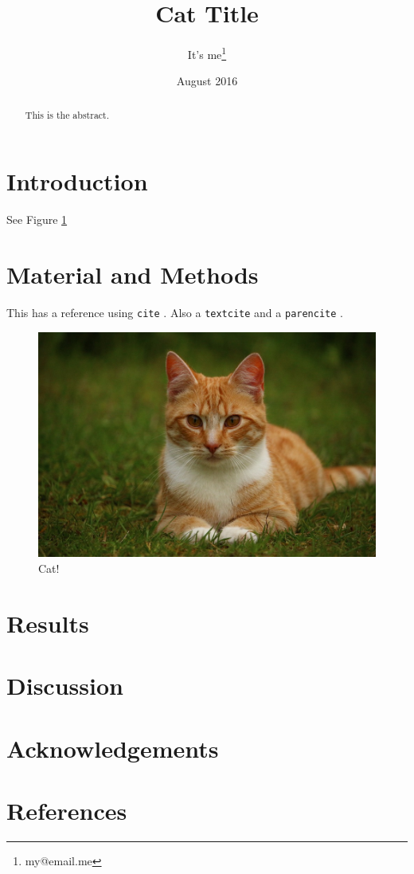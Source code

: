 \documentclass[twoside]{article}
\author{It's me\thanks{my@email.me}}
\date{August 2016}
\title{Cat Title}
\begin{document}
\maketitle
\begin{abstract}
This is the abstract.
\end{abstract}

\setcounter{tocdepth}{2}
\tableofcontents

\section{Introduction}
\label{sec:orgheadline1}

See Figure \ref{fig:orgparagraph1}
\section{Material and Methods}
\label{sec:orgheadline2}

This has a reference using \texttt{cite} \cite{Cats2016}. Also a \texttt{textcite} \textcite{Cats2016} and a \texttt{parencite} \parencite{Cats2016}.
\begin{figure}[htbp]
\centering
\includegraphics[width=\textwidth]{cats.jpg}
\caption{\label{fig:orgparagraph1}
Cat!}
\end{figure}

\section{Results}
\label{sec:orgheadline3}

\section{Discussion}
\label{sec:orgheadline4}

\section{Acknowledgements}
\label{sec:orgheadline5}

\section{References}
\label{sec:orgheadline6}

\printbibliography
\end{document}
